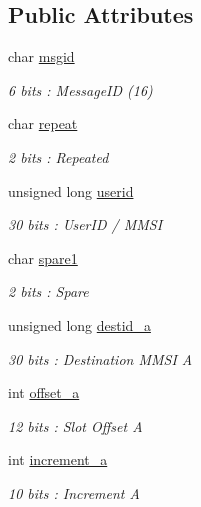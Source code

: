 \subsection*{Public Attributes}
\begin{DoxyCompactItemize}
\item 
char \mbox{\hyperlink{structaismsg__16_a50ff62f233b1c59233ca4b956ce66439}{msgid}}
\begin{DoxyCompactList}\small\item\em 6 bits \+: Message\+ID (16) \end{DoxyCompactList}\item 
char \mbox{\hyperlink{structaismsg__16_a4015419e0516d74f359f17a13b70b894}{repeat}}
\begin{DoxyCompactList}\small\item\em 2 bits \+: Repeated \end{DoxyCompactList}\item 
unsigned long \mbox{\hyperlink{structaismsg__16_a7e811edb86e859681646be5aad3970a6}{userid}}
\begin{DoxyCompactList}\small\item\em 30 bits \+: User\+ID / M\+M\+SI \end{DoxyCompactList}\item 
char \mbox{\hyperlink{structaismsg__16_a5458942f28ab2515b519f6a1d18845db}{spare1}}
\begin{DoxyCompactList}\small\item\em 2 bits \+: Spare \end{DoxyCompactList}\item 
unsigned long \mbox{\hyperlink{structaismsg__16_a30a42eb8b0449613fb1d327b36b20617}{destid\+\_\+a}}
\begin{DoxyCompactList}\small\item\em 30 bits \+: Destination M\+M\+SI A \end{DoxyCompactList}\item 
int \mbox{\hyperlink{structaismsg__16_aad02c6a8d52b1d1b4c9fe3b024a5bb3d}{offset\+\_\+a}}
\begin{DoxyCompactList}\small\item\em 12 bits \+: Slot Offset A \end{DoxyCompactList}\item 
int \mbox{\hyperlink{structaismsg__16_a9c30330fc44bf824d92970e5d116b1d2}{increment\+\_\+a}}
\begin{DoxyCompactList}\small\item\em 10 bits \+: Increment A \end{DoxyCompactList}\item 

\end{DoxyCompactItemize}
